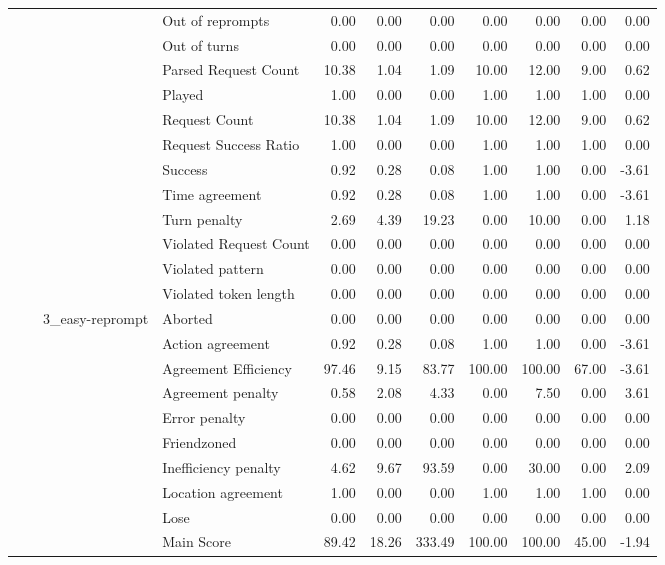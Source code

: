 \begin{tabular}{llllrrrrrrr}
 &  &  & Out of reprompts & 0.00 & 0.00 & 0.00 & 0.00 & 0.00 & 0.00 & 0.00 \\
 &  &  & Out of turns & 0.00 & 0.00 & 0.00 & 0.00 & 0.00 & 0.00 & 0.00 \\
 &  &  & Parsed Request Count & 10.38 & 1.04 & 1.09 & 10.00 & 12.00 & 9.00 & 0.62 \\
 &  &  & Played & 1.00 & 0.00 & 0.00 & 1.00 & 1.00 & 1.00 & 0.00 \\
 &  &  & Request Count & 10.38 & 1.04 & 1.09 & 10.00 & 12.00 & 9.00 & 0.62 \\
 &  &  & Request Success Ratio & 1.00 & 0.00 & 0.00 & 1.00 & 1.00 & 1.00 & 0.00 \\
 &  &  & Success & 0.92 & 0.28 & 0.08 & 1.00 & 1.00 & 0.00 & -3.61 \\
 &  &  & Time agreement & 0.92 & 0.28 & 0.08 & 1.00 & 1.00 & 0.00 & -3.61 \\
 &  &  & Turn penalty & 2.69 & 4.39 & 19.23 & 0.00 & 10.00 & 0.00 & 1.18 \\
 &  &  & Violated Request Count & 0.00 & 0.00 & 0.00 & 0.00 & 0.00 & 0.00 & 0.00 \\
 &  &  & Violated pattern & 0.00 & 0.00 & 0.00 & 0.00 & 0.00 & 0.00 & 0.00 \\
 &  &  & Violated token length & 0.00 & 0.00 & 0.00 & 0.00 & 0.00 & 0.00 & 0.00 \\
\cline{3-11}
 &  & \multirow[t]{27}{*}{3_easy-reprompt} & Aborted & 0.00 & 0.00 & 0.00 & 0.00 & 0.00 & 0.00 & 0.00 \\
 &  &  & Action agreement & 0.92 & 0.28 & 0.08 & 1.00 & 1.00 & 0.00 & -3.61 \\
 &  &  & Agreement Efficiency & 97.46 & 9.15 & 83.77 & 100.00 & 100.00 & 67.00 & -3.61 \\
 &  &  & Agreement penalty & 0.58 & 2.08 & 4.33 & 0.00 & 7.50 & 0.00 & 3.61 \\
 &  &  & Error penalty & 0.00 & 0.00 & 0.00 & 0.00 & 0.00 & 0.00 & 0.00 \\
 &  &  & Friendzoned & 0.00 & 0.00 & 0.00 & 0.00 & 0.00 & 0.00 & 0.00 \\
 &  &  & Inefficiency penalty & 4.62 & 9.67 & 93.59 & 0.00 & 30.00 & 0.00 & 2.09 \\
 &  &  & Location agreement & 1.00 & 0.00 & 0.00 & 1.00 & 1.00 & 1.00 & 0.00 \\
 &  &  & Lose & 0.00 & 0.00 & 0.00 & 0.00 & 0.00 & 0.00 & 0.00 \\
 &  &  & Main Score & 89.42 & 18.26 & 333.49 & 100.00 & 100.00 & 45.00 & -1.94 \\

\end{tabular}
